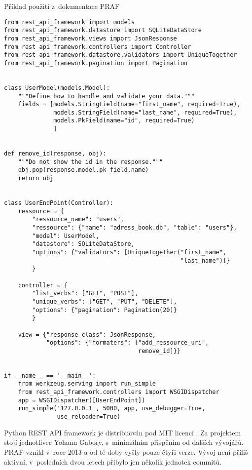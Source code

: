 \begin{listing}[htbp]
\caption{{\label{code:praf}Příklad použití z~dokumentace PRAF \autocite{praf}}}
\begin{verbatim}
from rest_api_framework import models
from rest_api_framework.datastore import SQLiteDataStore
from rest_api_framework.views import JsonResponse
from rest_api_framework.controllers import Controller
from rest_api_framework.datastore.validators import UniqueTogether
from rest_api_framework.pagination import Pagination


class UserModel(models.Model):
    """Define how to handle and validate your data."""
    fields = [models.StringField(name="first_name", required=True),
              models.StringField(name="last_name", required=True),
              models.PkField(name="id", required=True)
              ]


def remove_id(response, obj):
    """Do not show the id in the response."""
    obj.pop(response.model.pk_field.name)
    return obj


class UserEndPoint(Controller):
    ressource = {
        "ressource_name": "users",
        "ressource": {"name": "adress_book.db", "table": "users"},
        "model": UserModel,
        "datastore": SQLiteDataStore,
        "options": {"validators": [UniqueTogether("first_name",
                                                  "last_name")]}
        }

    controller = {
        "list_verbs": ["GET", "POST"],
        "unique_verbs": ["GET", "PUT", "DELETE"],
        "options": {"pagination": Pagination(20)}
        }

    view = {"response_class": JsonResponse,
            "options": {"formaters": ["add_ressource_uri",
                                      remove_id]}}


if __name__ == '__main__':
    from werkzeug.serving import run_simple
    from rest_api_framework.controllers import WSGIDispatcher
    app = WSGIDispatcher([UserEndPoint])
    run_simple('127.0.0.1', 5000, app, use_debugger=True,
               use_reloader=True)
\end{verbatim}
\end{listing}

Python REST API framework je distribuován pod MIT licencí \autocite{MIT}. Za projektem stojí jednotlivec Yohann Gabory, s~minimálním přispěním od dalších vývojářů. PRAF vznikl v~roce 2013 a od té doby vyšly pouze čtyři verze. Vývoj není příliš aktivní, v~posledních dvou letech přibylo jen několik jednotek commitů.

